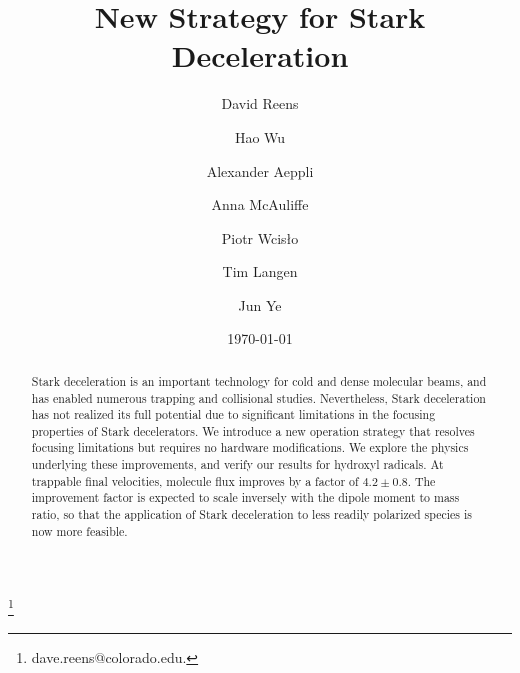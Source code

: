 \documentclass[%
 reprint,
 amsmath,amssymb,
 aps,
prl,
]{revtex4-1}
\begin{document}
\title{New Strategy for Stark Deceleration}%

\author{David Reens}
\thanks{dave.reens@colorado.edu.}


\author{Hao Wu}

\author{Alexander Aeppli}
\author{Anna McAuliffe}
\author{Piotr Wcis\l o}
\author{Tim Langen}%

\author{Jun Ye}


\date{\today}



\begin{abstract}
Stark deceleration is an important technology for cold and dense molecular beams, and has enabled numerous trapping and collisional studies.
Nevertheless, Stark deceleration has not realized its full potential due to significant limitations in the focusing properties of Stark decelerators.
We introduce a new operation strategy that resolves focusing limitations but requires no hardware modifications. 
We explore the physics underlying these improvements, and verify our results for hydroxyl radicals.
At trappable final velocities, molecule flux improves by a factor of $4.2\pm0.8$.
The improvement factor is expected to scale inversely with the dipole moment to mass ratio, so that the application of Stark deceleration to less readily polarized species is now more feasible.
\end{abstract}

\maketitle
\end{document}
